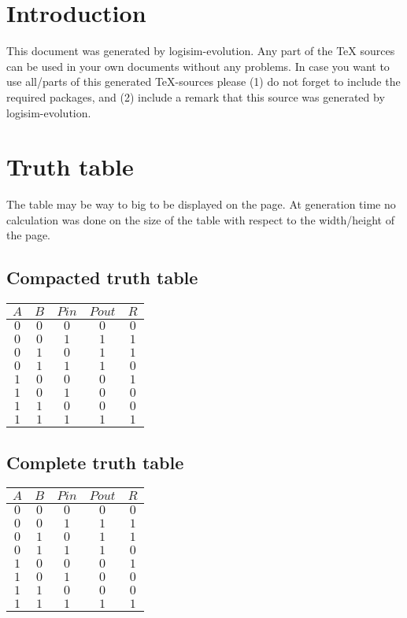 \documentclass [15pt,a4paper,twoside]{article}
\begin{document}
\section{Introduction}
This document was generated by logisim-evolution. Any part of the TeX sources can be used in your own documents without any problems. In case you want to use all/parts of this generated TeX-sources please (1) do not forget to include the required packages, and (2) include a remark that this source was generated by logisim-evolution.
\section{Truth table}
The table may be way to big to be displayed on the page. At generation time no calculation was done on the size of the table with respect to the width/height of the page.
\subsection{Compacted truth table}
\begin{center}
\begin{tabular}{ccc|cc}
$A$&$B$&$Pin$&$Pout$&$R$\\
\hline
$0$&$0$&$0$&$0$&$0$\\
$0$&$0$&$1$&$1$&$1$\\
$0$&$1$&$0$&$1$&$1$\\
$0$&$1$&$1$&$1$&$0$\\
$1$&$0$&$0$&$0$&$1$\\
$1$&$0$&$1$&$0$&$0$\\
$1$&$1$&$0$&$0$&$0$\\
$1$&$1$&$1$&$1$&$1$\\

\end{tabular}
\end{center}
\subsection{Complete truth table}
\begin{center}
\begin{tabular}{ccc|cc}
$A$&$B$&$Pin$&$Pout$&$R$\\
\hline
$0$&$0$&$0$&$0$&$0$\\
$0$&$0$&$1$&$1$&$1$\\
$0$&$1$&$0$&$1$&$1$\\
$0$&$1$&$1$&$1$&$0$\\
$1$&$0$&$0$&$0$&$1$\\
$1$&$0$&$1$&$0$&$0$\\
$1$&$1$&$0$&$0$&$0$\\
$1$&$1$&$1$&$1$&$1$\\

\end{tabular}
\end{center}
\end{document}

